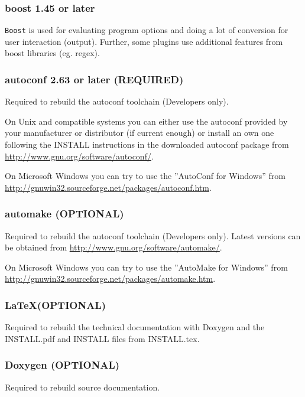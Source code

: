 \subsubsection{boost 1.45 or later}

\texttt{Boost} is used for evaluating program options and doing a lot
of conversion for user interaction (output). Further, some plugins use
additional features from boost libraries (eg. regex).

\subsubsection{autoconf 2.63 or later (REQUIRED)}

Required to rebuild the autoconf toolchain (Developers only).

On Unix and compatible systems you can either use the autoconf provided by
your manufacturer or distributor (if current enough) or install an own one
following the INSTALL instructions in the downloaded autoconf package from
\url{http://www.gnu.org/software/autoconf/}.

On Microsoft Windows you can try to use the ''AutoConf for Windows'' from
\url{http://gnuwin32.sourceforge.net/packages/autoconf.htm}.

\subsubsection{automake (OPTIONAL)}

Required to rebuild the autoconf toolchain (Developers only). Latest
versions can be obtained from \url{http://www.gnu.org/software/automake/}.

On Microsoft Windows you can try to use the ''AutoMake for Windows'' from
\url{http://gnuwin32.sourceforge.net/packages/automake.htm}.

\subsubsection{\LaTeX (OPTIONAL)}

Required to rebuild the technical documentation with Doxygen and the
INSTALL.pdf and INSTALL files from INSTALL.tex.

\subsubsection{Doxygen (OPTIONAL)}

Required to rebuild source documentation.

